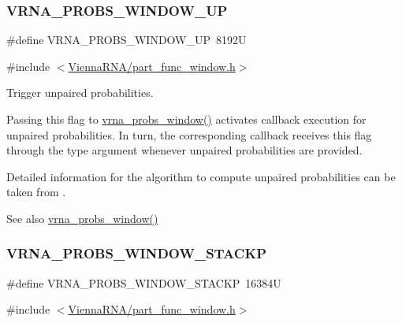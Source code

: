 \subsubsection{\texorpdfstring{VRNA\_PROBS\_WINDOW\_UP}{VRNA\_PROBS\_WINDOW\_UP}}
{\footnotesize\ttfamily \#define V\+R\+N\+A\+\_\+\+P\+R\+O\+B\+S\+\_\+\+W\+I\+N\+D\+O\+W\+\_\+\+UP~8192U}



{\ttfamily \#include $<$\mbox{\hyperlink{part__func__window_8h}{Vienna\+R\+N\+A/part\+\_\+func\+\_\+window.\+h}}$>$}



Trigger unpaired probabilities. 

Passing this flag to \mbox{\hyperlink{group__part__func__window_ga7115d012988541a65ec323c5f17a334b}{vrna\+\_\+probs\+\_\+window()}} activates callback execution for unpaired probabilities. In turn, the corresponding callback receives this flag through the {\ttfamily type} argument whenever unpaired probabilities are provided.

Detailed information for the algorithm to compute unpaired probabilities can be taken from \cite{bernhart:2011}.

\begin{DoxySeeAlso}{See also}
\mbox{\hyperlink{group__part__func__window_ga7115d012988541a65ec323c5f17a334b}{vrna\+\_\+probs\+\_\+window()}} 
\end{DoxySeeAlso}
\mbox{\label{group__part__func__window_ga0a13fc668b02f21b225e2334e4caac08}} 
\subsubsection{\texorpdfstring{VRNA\_PROBS\_WINDOW\_STACKP}{VRNA\_PROBS\_WINDOW\_STACKP}}
{\footnotesize\ttfamily \#define V\+R\+N\+A\+\_\+\+P\+R\+O\+B\+S\+\_\+\+W\+I\+N\+D\+O\+W\+\_\+\+S\+T\+A\+C\+KP~16384U}



{\ttfamily \#include $<$\mbox{\hyperlink{part__func__window_8h}{Vienna\+R\+N\+A/part\+\_\+func\+\_\+window.\+h}}$>$}



